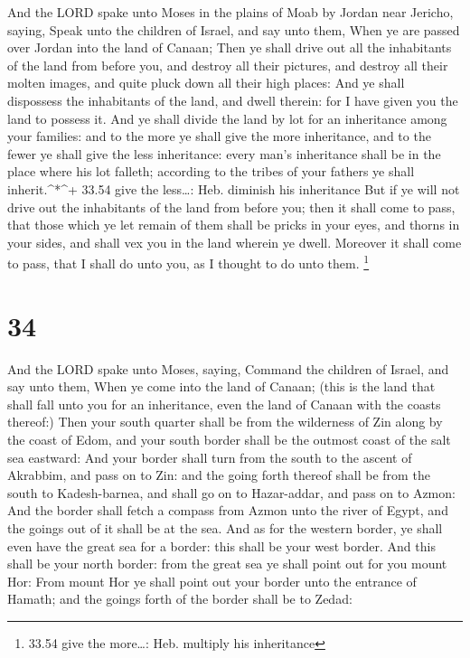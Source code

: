  And the LORD spake unto Moses in the plains of Moab by
Jordan near Jericho, saying,  Speak unto the children of
Israel, and say unto them, When ye are passed over Jordan into the land
of Canaan;  Then ye shall drive out all the inhabitants of
the land from before you, and destroy all their pictures, and destroy
all their molten images, and quite pluck down all their high places:
 And ye shall dispossess the inhabitants of the land, and
dwell therein: for I have given you the land to possess it.
 And ye shall divide the land by lot for an inheritance
among your families: and to the more ye shall give the more inheritance,
and to the fewer ye shall give the less inheritance: every man's
inheritance shall be in the place where his lot falleth; according to
the tribes of your fathers ye shall inherit.\^{}*\^{}+ 33.54 give the
less\ldots: Heb. diminish his inheritance  But if ye will
not drive out the inhabitants of the land from before you; then it shall
come to pass, that those which ye let remain of them shall be pricks in
your eyes, and thorns in your sides, and shall vex you in the land
wherein ye dwell.  Moreover it shall come to pass, that I
shall do unto you, as I thought to do unto them. \footnote{33.54 give
  the more\ldots: Heb. multiply his inheritance}

\hypertarget{section-33}{%
\section{34}\label{section-33}}

 And the LORD spake unto Moses, saying,  Command
the children of Israel, and say unto them, When ye come into the land of
Canaan; (this is the land that shall fall unto you for an inheritance,
even the land of Canaan with the coasts thereof:)  Then your
south quarter shall be from the wilderness of Zin along by the coast of
Edom, and your south border shall be the outmost coast of the salt sea
eastward:  And your border shall turn from the south to the
ascent of Akrabbim, and pass on to Zin: and the going forth thereof
shall be from the south to Kadesh-barnea, and shall go on to
Hazar-addar, and pass on to Azmon:  And the border shall
fetch a compass from Azmon unto the river of Egypt, and the goings out
of it shall be at the sea.  And as for the western border,
ye shall even have the great sea for a border: this shall be your west
border.  And this shall be your north border: from the great
sea ye shall point out for you mount Hor:  From mount Hor ye
shall point out your border unto the entrance of Hamath; and the goings
forth of the border shall be to Zedad:

